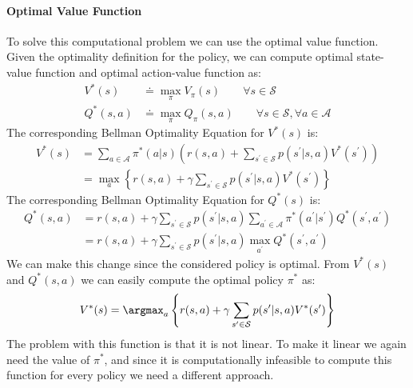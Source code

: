 \paragraph*{Optimal Value Function}
To solve this computational problem we can use the optimal value function. 
Given the optimality definition for the policy, we can compute optimal state-value function and optimal action-value function as:
\begin{align*}
        V^\ast(s) &\doteq \max_{\pi} V_{\pi}(s) \qquad \forall s \in \mathcal{S} \\
        Q^\ast(s,a) &\doteq \max_{\pi} Q_{\pi}(s,a) \qquad \forall s \in \mathcal{S}, \forall a \in \mathcal{A}
\end{align*}
The corresponding Bellman Optimality Equation for $V^\ast(s)$ is: 
\begin{align*}
    V^\ast(s)  &= \sum_{a \in \mathcal{A}} \pi^\ast(a|s) \left( r(s,a) + \sum_{s^\prime \in \mathcal{S}} p(s^\prime | s, a) V^\ast(s^\prime) \right) \\
            &= \max_a \left\{ r(s,a) + \gamma \sum_{s^\prime \in \mathcal{S}} p(s^\prime | s, a) V^\ast(s^\prime) \right\}
\end{align*}
The corresponding Bellman Optimality Equation for $Q^\ast(s)$ is: 
\begin{align*}
    Q^\ast(s,a) &=r(s,a)+\gamma\sum_{s^\prime\in\mathcal{S}}p(s^\prime|s,a)\sum_{a^\prime\in\mathcal{A}}\pi^\ast(a^\prime|s^\prime)Q^\ast(s^\prime,a^\prime) \\
                &=r(s,a)+\gamma\sum_{s^\prime\in\mathcal{S}}p(s^\prime|s,a)\max_{a^\prime}Q^\ast(s^\prime,a^\prime)
\end{align*}
We can make this change since the considered policy is optimal. 
From $V^\ast(s)$ and $Q^\ast(s,a)$ we can easily compute the optimal policy $\pi^\ast$ as: 
\[V^\ast(s)=\argmax_a\left\{r(s,a)+\gamma\sum_{s^\prime\in\mathcal{S}}p(s^\prime|s,a)V^\ast(s^\prime)\right\}\]
The problem with this function is that it is not linear. 
To make it linear we again need the value of $\pi^\ast$, and since it is computationally infeasible to compute this function for every policy we need a different approach. 